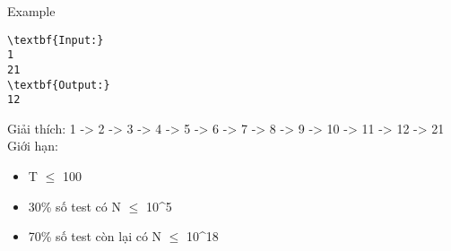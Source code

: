 Example
\begin{verbatim}
\textbf{Input:}
1
21
\textbf{Output:}
12\end{verbatim}
Giải thích:
1 -> 2 -> 3 -> 4 -> 5 -> 6 -> 7 -> 8 -> 9 -> 10 -> 11 -> 12 -> 21
Giới hạn:
\begin{itemize}
	\item T  $\le$  100
	\item 30\% số test có N  $\le$  10^5
	\item 70\% số test còn lại có N  $\le$  10^18
\end{itemize}